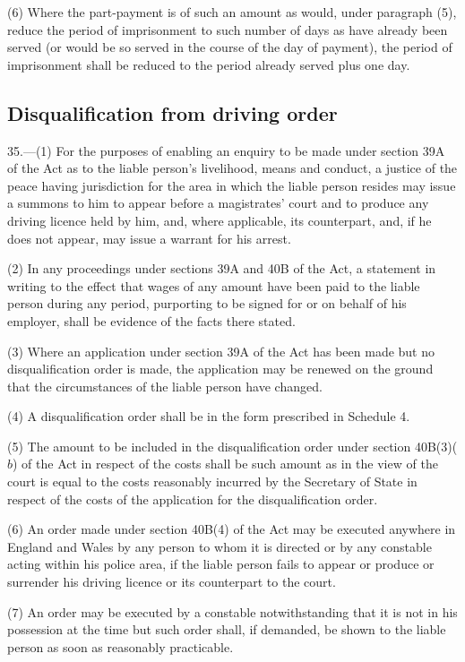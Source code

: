 \documentclass[12pt,a4paper]{article}
\begin{document}
(6) Where the part-payment is of such an amount as would, under paragraph (5), reduce the period of imprisonment to such number of days as have already been served (or would be so served in the course of the day of payment), the period of imprisonment shall be reduced to the period already served plus one day.

\subsection[35. Disqualification from driving order]{Disqualification from driving order}

35.---(1)  For the purposes of enabling an enquiry to be made under section 39A of the Act as to the liable person’s livelihood, means and conduct, a justice of the peace having jurisdiction for the area in which the liable person resides may issue a summons to him to appear before a magistrates' court and to produce any driving licence held by him, and, where applicable, its counterpart, and, if he does not appear, may issue a warrant for his arrest.

(2) In any proceedings under sections 39A and 40B of the Act, a statement in writing to the effect that wages of any amount have been paid to the liable person during any period, purporting to be signed for or on behalf of his employer, shall be evidence of the facts there stated.

(3) Where an application under section 39A of the Act has been made but no disqualification order is made, the application may be renewed on the ground that the circumstances of the liable person have changed.

(4) A disqualification order shall be in the form prescribed in Schedule 4.

(5) The amount to be included in the disqualification order under section 40B(3)($b$)  of the Act in respect of the costs shall be such amount as in the view of the court is equal to the costs reasonably incurred by the Secretary of State in respect of the costs of the application for the disqualification order.

(6) An order made under section 40B(4) of the Act may be executed anywhere in England and Wales by any person to whom it is directed or by any constable acting within his police area, if the liable person fails to appear or produce or surrender his driving licence or its counterpart to the court.

(7) An order may be executed by a constable notwithstanding that it is not in his possession at the time but such order shall, if demanded, be shown to the liable person as soon as reasonably practicable.
\end{document}

